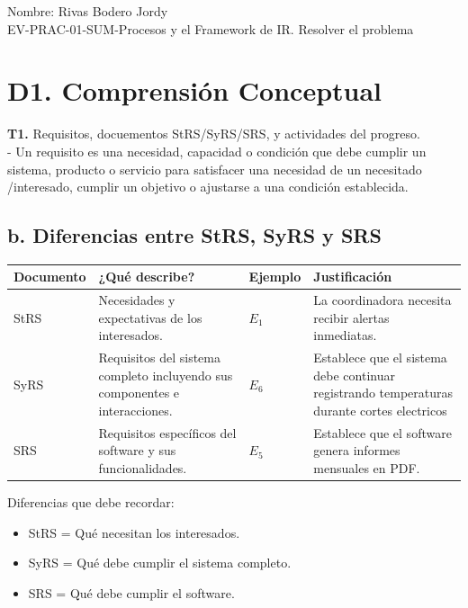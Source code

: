 \documentclass{article}
\begin{document}
Nombre: Rivas Bodero Jordy \\
EV-PRAC-01-SUM-Procesos y el Framework de IR. Resolver el problema

\section*{D1. Comprensión Conceptual}
\textbf{T1.} Requisitos, docuementos StRS/SyRS/SRS, y actividades del progreso. \\
- Un requisito es una necesidad, capacidad o condición que debe cumplir un sistema, producto o servicio para satisfacer una necesidad de un necesitado /interesado, cumplir un objetivo o ajustarse a una condición establecida.

\subsection*{b. Diferencias entre StRS, SyRS y SRS}
\begin{center}
\begin{tabular}{|p{2cm}|p{4cm}|p{1.5cm}|p{5cm}|}
\hline
\textbf{Documento} & \textbf{¿Qué describe?} & \textbf{Ejemplo} & \textbf{Justificación} \\ \hline
StRS & Necesidades y expectativas de los interesados. & $E_1$ & La coordinadora necesita recibir alertas inmediatas. \\ \hline
SyRS & Requisitos del sistema completo incluyendo sus componentes e interacciones. & $E_6$ & Establece que el sistema debe continuar registrando temperaturas durante cortes electricos\\ \hline
SRS & Requisitos específicos del software y sus funcionalidades. & $E_5$ & Establece que el software genera informes mensuales en PDF. \\ \hline
\end{tabular}
\end{center}

Diferencias que debe recordar:
\begin{itemize}
    \item StRS = Qué necesitan los interesados.
    \item SyRS = Qué debe cumplir el sistema completo.
    \item SRS = Qué debe cumplir el software.
\end{itemize}
\end{document}
